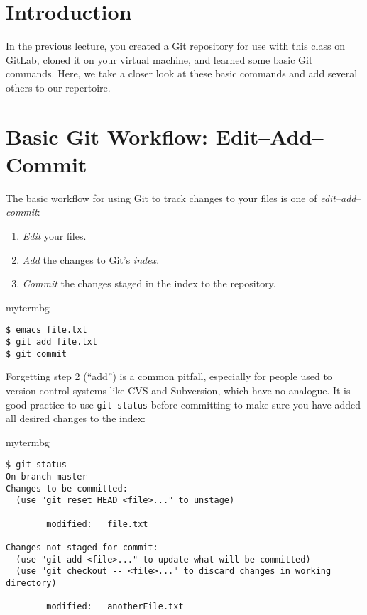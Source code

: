 
\minitoc

\section{Introduction}

In the previous lecture, you created a Git repository for use with this class
on GitLab, cloned it on your virtual machine, and learned some basic Git
commands.  Here, we take a closer look at these basic commands and add several
others to our repertoire.

\section{Basic Git Workflow:  Edit--Add--Commit}

The basic workflow for using Git to track changes to your files is one of
\emph{edit}--\emph{add}--\emph{commit}:

\begin{enumerate}

\item \emph{Edit} your files.

\item \emph{Add} the changes to Git's \emph{index}.

\item \emph{Commit} the changes staged in the index to the repository.

\end{enumerate}

\begin{tsession}{mytermbg}
\begin{verbatim}
$ emacs file.txt
$ git add file.txt
$ git commit
\end{verbatim}
\end{tsession}

Forgetting step 2 (``add'') is a common pitfall, especially for people used to
version control systems like CVS and Subversion, which have no analogue.  It is
good practice to use \texttt{git status} before committing to make sure you
have added all desired changes to the index:

\begin{tsession}{mytermbg}
\begin{verbatim}
$ git status
On branch master
Changes to be committed:
  (use "git reset HEAD <file>..." to unstage)

        modified:   file.txt

Changes not staged for commit:
  (use "git add <file>..." to update what will be committed)
  (use "git checkout -- <file>..." to discard changes in working directory)

        modified:   anotherFile.txt
\end{verbatim}
\end{tsession}

